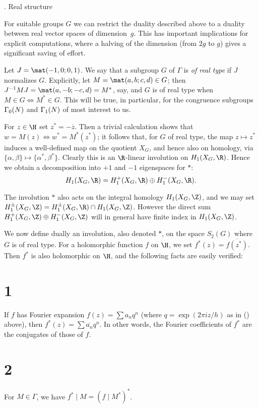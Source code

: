 \beginsubsection{\realstruc}
\subhead \realstruc. Real structure \endsubhead

For suitable groups $G$ we can restrict the duality described above to
a duality between real vector spaces of dimension~$g$.  This has
important implications for explicit computations, where a halving of
the dimension (from $2g$ to $g$) gives a significant saving of effort.

Let $J=\mat(-1,0;0,1)$.  We say that a subgroup $G$ of $\Gamma$ is
{\it of real type\/} if $J$ normalizes $G$.  Explicitly, let
$M=\mat(a,b;c,d)\in G$; then $J^{-1}M J = \mat(a,-b;-c,d) = M^*$, say,
and $G$ is of real type when $M\in G\iff M^*\in G$.  This will be
true, in particular, for the congruence subgroups $\G0(N)$ and
$\G1(N)$ of most interest to us.

For $z\in\H$ set $z^* = -\overline{z}$.  Then a trivial calculation
shows that $w=M(z) \iff w^*=M^*(z^*)$; it follows that, for
$G$ of real type, the map $z\mapsto z^*$ induces a well-defined map on
the quotient $X_G$, and hence also on homology, via $\{\alpha,\beta\}
\mapsto \{\alpha^*,\beta^*\}$.  Clearly this is an $\R$-linear
involution on $H_1(X_G,\R)$.  Hence we obtain a decomposition into
$+1$ and $-1$ eigenspaces for $*$:
$$
  H_1(X_G,\R) = H_1^+(X_G,\R) \oplus H_1^-(X_G,\R).
$$

 The involution $*$ also acts on the integral homology
$H_1(X_G,\Z)$, and we may set $H_1^{\pm}(X_G,\Z) = H_1^{\pm}(X_G,\R)
\cap H_1(X_G,\Z)$.  However the direct sum $H_1^{+}(X_G,\Z)
\oplus H_1^{-}(X_G,\Z)$ will in general have finite index in
$H_1(X_G,\Z)$.
\endremark

We now define dually an involution, also denoted $*$, on the space
$S_2(G)$ where $G$ is of real type.  For a holomorphic function $f$ on
$\H$, we set $f^*(z) = \overline{f(z^*)}$.  Then $f^*$ is also
holomorphic on $\H$, and the following facts are easily verified:

\part{1} If $f$ has Fourier expansion $f(z)=\sum a_nq^n$ (where
$q=\exp(2\pi iz/h)$ as in (\fourier) above), then $f^*(z) =
\sum\overline{a_n}q^n$.  In other words, the Fourier coefficients of
$f^*$ are the conjugates of those of $f$.

\part{2} For $M\in\Gamma$, we have $f^*\mid M = (f\mid M^*)^*$.

